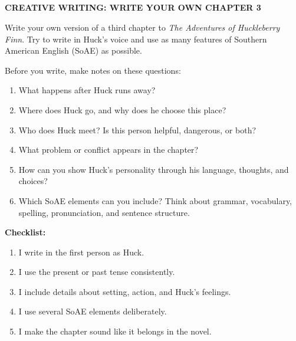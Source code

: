 \documentclass[10pt,a4paper,table]{article}
\begin{document}
\clearpage

\subsection{}
\textbf{CREATIVE WRITING: WRITE YOUR OWN CHAPTER 3}

Write your own version of a third chapter to \textit{The Adventures of Huckleberry Finn}. Try to write in Huck's voice and use as many features of Southern American English (SoAE) as possible.

Before you write, make notes on these questions:

\begin{enumerate}[label=\arabic*., leftmargin=*]
  \item What happens after Huck runs away?
  \item Where does Huck go, and why does he choose this place?
  \item Who does Huck meet? Is this person helpful, dangerous, or both?
  \item What problem or conflict appears in the chapter?
  \item How can you show Huck's personality through his language, thoughts, and choices?
  \item Which SoAE elements can you include? Think about grammar, vocabulary, spelling, pronunciation, and sentence structure.
\end{enumerate}

\vspace{0.5em}
\textbf{Checklist:}
\begin{enumerate}[label=\textbf{\alph*.}, leftmargin=1.5em]
  \item I write in the first person as Huck.
  \item I use the present or past tense consistently.
  \item I include details about setting, action, and Huck's feelings.
  \item I use several SoAE elements deliberately.
  \item I make the chapter sound like it belongs in the novel.
\end{enumerate}
\end{document}
